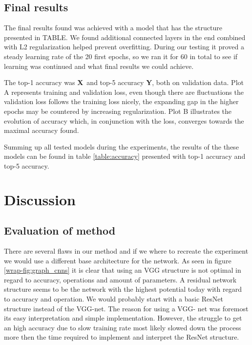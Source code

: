 \documentclass{kthreport}
\begin{document}
% 

\newpage
\subsection{Final results}
\FloatBarrier



\begin{table}
  
\end{table}
The final results found was achieved with a model that has the structure presented in TABLE. We found additional connected layers in the end combined with L2 regularization helped prevent overfitting. During our testing it proved a steady learning rate of the 20 first epochs, so we ran it for 60 in total to see if learning was continued and what final results we could achieve.

The top-1 accuracy was \textbf{X}\ and top-5 accuracy \textbf{Y}, both on validation data. Plot A represents training and validation loss, even though there are fluctuations the validation loss follows the training loss nicely, the expanding gap in the higher epochs may be countered by increasing regularization. Plot B illustrates the evolution of accuracy which, in conjunction with the loss, converges towards the maximal accuracy found.

Summing up all tested models during the experiments, the results of the these models can be found in table \ref{table:accuracy} presented with top-1 accuracy and top-5 accuracy. \\




\clearpage
\section{Discussion}
\label{sec:Discussion}

\subsection{Evaluation of method}

There are several flaws in our method and if we where to recreate the experiment we would use a different base architecture for the network.
As seen in figure \ref{wrap-fig:graph_cnns} it is clear that using an VGG structure is not optimal in regard to accuracy, operations and amount of parameters.
A residual network structure seems to be the network with the highest potential today with regard to accuracy and operation.
We would probably start with a basic ResNet structure instead of the VGG-net.
The reason for using a VGG- net was foremost its easy interpretation and simple implementation. However, the struggle to get an high accuracy due to slow training rate most likely slowed down the process more then the time required to implement and interpret the ResNet structure.
\end{document}
